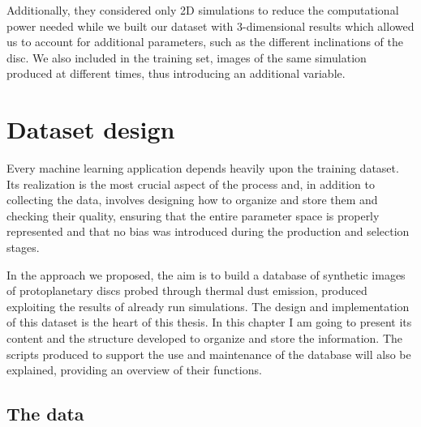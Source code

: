 \documentclass[a4paper,10pt]{report}
\begin{document}
Additionally, they considered only 2D simulations to reduce the computational power needed
while we built our dataset with 3-dimensional results which allowed us to account for additional parameters, such as the different 
inclinations of the disc. We also included in the training set, images of the same simulation
produced at different times, thus introducing an additional variable.

\chapter{Dataset design}

Every machine learning application depends heavily upon the training dataset. 
Its realization is the most crucial aspect of the process and, in addition to collecting the data,
involves designing how to organize and store them and checking their quality, 
ensuring that the entire parameter space is properly represented and that no bias was introduced during
the production and selection stages.

In the approach we proposed, the aim is to build a database of synthetic images of protoplanetary discs
probed through thermal dust emission, produced exploiting 
the results of already run simulations. The design and implementation of this dataset is the heart of this
thesis. In this chapter I am going to present its content and the structure developed to organize and store the information. 
The scripts produced to support the use and maintenance of the database will also be explained, 
providing an overview of their functions.

\section{The data}

\end{document}
